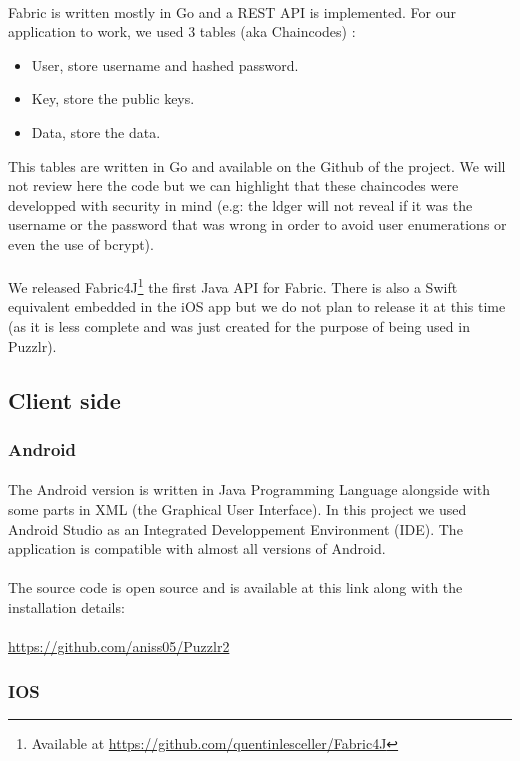  			\paragraph{}
			Fabric is written mostly in Go and a REST API is implemented. For our application to work, we used 3 tables (aka Chaincodes) : 
 			\begin{itemize}
 			\item User, store username and hashed password.
 			\item Key, store the public keys.
 			\item Data, store the data.
 			\end{itemize}
 			This tables are written in Go and available on the Github of the project. We will not review here the code but we can highlight that these chaincodes were developped with security in mind (e.g: the ldger will not reveal if it was the username or the password that was wrong in order to avoid user enumerations or even the use of bcrypt).
 			\paragraph{}
 			We released Fabric4J\footnote{Available at \url{https://github.com/quentinlesceller/Fabric4J}} the first Java API for Fabric. There is also a Swift equivalent embedded in the iOS app but we do not plan to release it at this time (as it is less complete and was just created for the purpose of being used in Puzzlr).
 	\subsection{Client side}
 		\subsubsection{Android}
  			\paragraph{}
			The Android version is written in Java Programming Language alongside with some parts in XML (the Graphical User Interface). In this project we used Android Studio as an Integrated Developpement Environment (IDE). The application is compatible with almost all versions of Android.
			\paragraph{}
			The source code is open source and is available at this link along with the installation details:
			\paragraph{}
			\color{blue}\underline{https://github.com/aniss05/Puzzlr2}\color{black} 
	  
	\subsubsection{IOS}